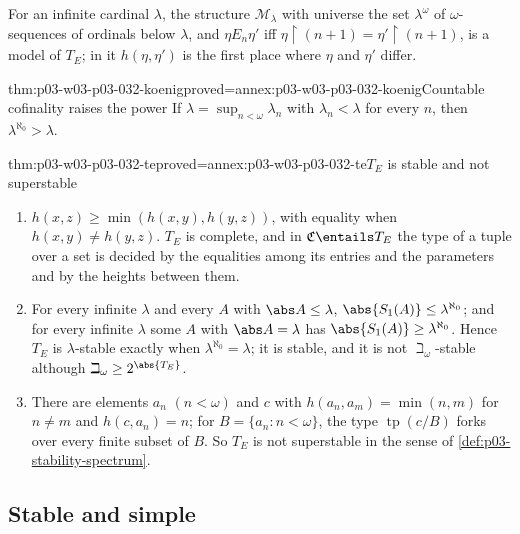 For an infinite cardinal \(\lambda\), the structure \(\mathcal M_\lambda\)
with universe the set \(\lambda^\omega\) of \(\omega\)-sequences of ordinals
below \(\lambda\), and \(\eta\mathrel{E_n}\eta'\) iff
\(\eta\mathbin{\upharpoonright}(n+1)=\eta'\mathbin{\upharpoonright}(n+1)\), is a
model of \(T_E\); in it \(h(\eta,\eta')\) is the first place where
\(\eta\) and \(\eta'\) differ.

\begin{hblemma}{thm:p03-w03-p03-032-koenig}{proved=annex:p03-w03-p03-032-koenig}{Countable cofinality raises the power}
If \(\lambda=\sup_{n<\omega}\lambda_n\) with \(\lambda_n<\lambda\) for every
\(n\), then \(\lambda^{\aleph_0}>\lambda\).
\end{hblemma}

\begin{hbtheorem}{thm:p03-w03-p03-032-te}{proved=annex:p03-w03-p03-032-te}{\(T_E\) is stable and not superstable}
\begin{enumerate}
  \item \(h(x,z)\geq\min(h(x,y),h(y,z))\), with equality when
        \(h(x,y)\neq h(y,z)\).  \(T_E\) is complete, and in
        \(\mathfrak C\entails T_E\) the type of a tuple over a set is decided by
        the equalities among its entries and the parameters and by the
        heights between them.
  \item For every infinite \(\lambda\) and every \(A\) with
        \(\abs A\leq\lambda\),
        \(\abs{S_1(A)}\leq\lambda^{\aleph_0}\); and for every infinite
        \(\lambda\) some \(A\) with \(\abs A=\lambda\) has
        \(\abs{S_1(A)}\geq\lambda^{\aleph_0}\).  Hence \(T_E\) is
        \(\lambda\)-stable exactly when \(\lambda^{\aleph_0}=\lambda\); it is
        stable, and it is not \(\beth_\omega\)-stable although
        \(\beth_\omega\geq2^{\abs{T_E}}\).
  \item There are elements \(a_n\) \((n<\omega)\) and \(c\) with
        \(h(a_n,a_m)=\min(n,m)\) for \(n\neq m\) and \(h(c,a_n)=n\); for
        \(B=\{a_n:n<\omega\}\), the type \(\operatorname{tp}(c/B)\) forks over
        every finite subset of \(B\).  So \(T_E\) is not superstable in the
        sense of \cref{def:p03-stability-spectrum}.
\end{enumerate}
\end{hbtheorem}

\subsection{Stable and simple}

